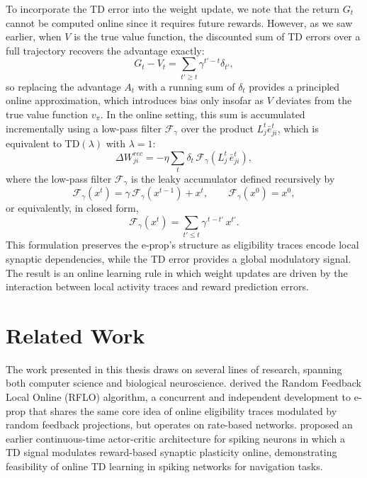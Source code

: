 To incorporate the TD error into the weight update, we note that the return
$G_t$ cannot be computed online since it requires future rewards.
However, as we saw earlier, when $V$ is the true value function, the discounted 
sum of TD errors over a full trajectory recovers the advantage exactly:
\begin{equation}
    G_t - V_t = \sum_{t' \geq t} \gamma^{t'-t} \delta_{t'},
\end{equation}
so replacing the advantage $A_t$ with a running sum of $\delta_t$ provides a 
principled online approximation, which introduces bias only insofar as $V$ 
deviates from the true value function $v_\pi$. In the online
setting, this sum is accumulated incrementally using a low-pass filter
$\mathcal{F}_\gamma$ over the product $L^t_j \bar{e}^t_{ji}$, which is
equivalent to TD$(\lambda)$ with $\lambda = 1$:
\begin{equation} \label{eq:tdeprop}
\Delta W^{rec}_{ji}
=
-\eta \sum_t \delta_t \, \mathcal{F}_\gamma\!\left(L^t_j \,\bar e^t_{ji}\right),
\end{equation}
where the low-pass filter $\mathcal{F}_\gamma$ is the leaky accumulator defined
recursively by
\begin{equation} \label{eq:filter-gamma}
\mathcal{F}_\gamma\!\left(x^t\right) = \gamma\,\mathcal{F}_\gamma\!\left(x^{t-1}\right) + x^t,
\qquad \mathcal{F}_\gamma\!\left(x^0\right) = x^0,
\end{equation}
or equivalently, in closed form,
\begin{equation} \label{eq:filter-gamma-closed}
\mathcal{F}_\gamma\!\left(x^t\right) = \sum_{t' \leq t} \gamma^{\,t-t'}\, x^{t'}.
\end{equation}
This formulation preserves the e-prop's structure as eligibility traces encode
local synaptic dependencies, while the TD error provides a global modulatory
signal. The result is an online learning rule in which weight updates are
driven by the interaction between local activity traces and reward prediction
errors.

\section{Related Work}
\label{sec:related_work}

The work presented in this thesis draws on several lines of research,
spanning both computer science and biological neuroscience.
\citet{murray2019local} derived the Random Feedback Local Online (RFLO) algorithm, a
concurrent and independent development to e-prop that shares the same core idea of
online eligibility traces modulated by random feedback projections, but operates on
rate-based networks. \citet{Frmaux2013ReinforcementLU} proposed an
earlier continuous-time actor-critic architecture for spiking neurons in which a TD
signal modulates reward-based synaptic plasticity online, demonstrating feasibility of
online TD learning in spiking networks for navigation tasks.

